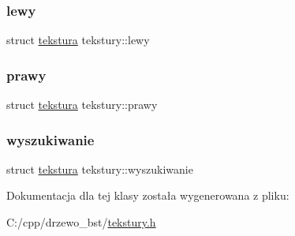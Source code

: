 \mbox{\label{classtekstury_a1180f008cfa3be39070886f4cc332403}} 
\subsubsection{\texorpdfstring{lewy}{lewy}}
{\footnotesize\ttfamily struct \mbox{\hyperlink{classtekstura}{tekstura}} tekstury\+::lewy}

\mbox{\label{classtekstury_a46e17183769205f5de0b31d1c1240ada}} 
\subsubsection{\texorpdfstring{prawy}{prawy}}
{\footnotesize\ttfamily struct \mbox{\hyperlink{classtekstura}{tekstura}} tekstury\+::prawy}

\mbox{\label{classtekstury_a7a64df71fd68f590fd46a26216a23b30}} 
\subsubsection{\texorpdfstring{wyszukiwanie}{wyszukiwanie}}
{\footnotesize\ttfamily struct \mbox{\hyperlink{classtekstura}{tekstura}} tekstury\+::wyszukiwanie}



Dokumentacja dla tej klasy została wygenerowana z pliku\+:\begin{DoxyCompactItemize}
\item 
C\+:/cpp/drzewo\+\_\+bst/\mbox{\hyperlink{tekstury_8h}{tekstury.\+h}}\end{DoxyCompactItemize}
